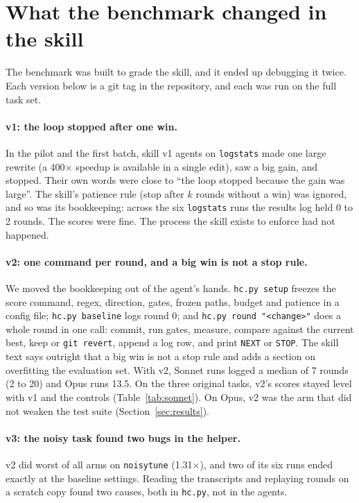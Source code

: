 \section{What the benchmark changed in the skill}
\label{sec:fix}

The benchmark was built to grade the skill, and it ended up debugging it twice. Each version below is a git tag
in the repository, and each was run on the full task set.

\paragraph{v1: the loop stopped after one win.} In the pilot and the first batch, skill v1 agents on
\texttt{logstats} made one large rewrite (a 400$\times$ speedup is available in a single edit), saw a big gain,
and stopped. Their own words were close to ``the loop stopped because the gain was large''. The skill's patience
rule (stop after $k$ rounds without a win) was ignored, and so was its bookkeeping: across the six
\texttt{logstats} runs the results log held 0 to 2 rounds. The scores were
fine. The process the skill exists to enforce had not happened.

\paragraph{v2: one command per round, and a big win is not a stop rule.} We moved the bookkeeping out of the
agent's hands. \texttt{hc.py setup} freezes the score command, regex, direction, gates, frozen paths, budget and
patience in a config file; \texttt{hc.py baseline} logs round 0; and \texttt{hc.py round "<change>"} does a whole
round in one call: commit, run gates, measure, compare against the current best, keep or \texttt{git revert},
append a log row, and print \texttt{NEXT} or \texttt{STOP}. The skill text says outright that a big win is not a
stop rule and adds a section on overfitting the evaluation set. With v2, Sonnet runs logged a median of 7 rounds
(2 to 20) and Opus runs 13.5. On the three original tasks, v2's scores stayed level with v1 and the controls
(Table~\ref{tab:sonnet}). On Opus, v2 was the arm that did not weaken the test suite (Section~\ref{sec:results}).

\paragraph{v3: the noisy task found two bugs in the helper.} v2 did worst of all arms on \texttt{noisytune}
(1.31$\times$), and two of its six runs ended exactly at the baseline settings. Reading the transcripts and
replaying rounds on a scratch copy found two causes, both in \texttt{hc.py}, not in the agents.

